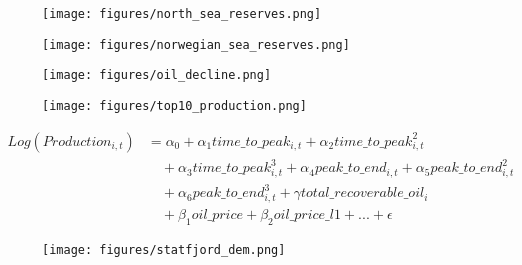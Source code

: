 \documentclass{beamer}
\begin{document}
\begin{frame}[plain]
	\begin{figure}
	\texttt{[image: figures/north\_sea\_reserves.png]}
	\caption*{}
	\label{north_sea_reserves}
	\end{figure}
\end{frame}


\begin{frame}[plain]
	\begin{figure}
	\texttt{[image: figures/norwegian\_sea\_reserves.png]}
	\caption*{}
	\label{norwegian_sea_reserves}
	\end{figure}
\end{frame}


\begin{frame}[plain]

\begin{figure}
	\texttt{[image: figures/oil\_decline.png]}
	\caption*{}
	\label{oil_decline}
\end{figure}

\end{frame}


\begin{frame}[plain]
	\begin{figure}
	\texttt{[image: figures/top10\_production.png]}
	\caption*{}
	\label{top10_production}	
	\end{figure}
\end{frame}







\begin{frame}[plain]
	\begin{equation}
		\begin{split}
		 Log(Production_{i,t}) & = \alpha_0 + \alpha_1 time\_to\_peak_{i,t} + \alpha_2 time\_to\_peak_{i,t}^2 \\
		& \quad + \alpha_3 time\_to\_peak_{i,t}^3  + \alpha_4 peak\_to\_end_{i,t} + \alpha_5 peak\_to\_end_{i,t}^2 \\
		& \quad + \alpha_6 peak\_to\_end_{i,t}^3 + \gamma total\_recoverable\_oil_i \\
		& \quad + \beta_1 oil\_price + \beta_2 oil\_price\_l1 + ...+ \epsilon
		\end{split}
	\label{glm_eqn}
		\end{equation}
\end{frame}


\begin{frame}[plain]
	\begin{figure}
	\texttt{[image: figures/statfjord\_dem.png]}
	\caption*{}
	\label{statfjord_dem}
	\end{figure}
\end{frame}
\end{document}

